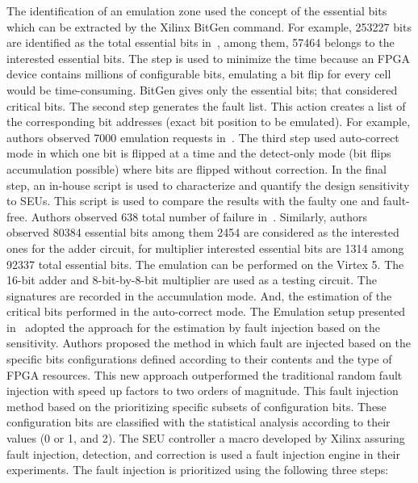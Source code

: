 The identification of an emulation zone used the concept of the essential bits which can be extracted by the Xilinx BitGen command. For example, 253227 bits are identified as the total essential bits in~\cite{hobeika2013flight}, among them, 57464 belongs to the interested essential bits. The step is used to minimize the time because an FPGA device contains millions of configurable bits, emulating a bit flip for every cell would be time-consuming. BitGen gives only the essential bits; that
considered critical bits. The second step generates the fault list. This action creates a list of the corresponding bit addresses (exact bit position to be emulated).  For example, authors observed 7000 emulation requests in~\cite{hobeika2013flight}.  The third step used auto-correct mode in which one bit is flipped at a time and the detect-only mode  (bit flips accumulation possible) where bits are flipped without correction. In the final step, an in-house script is used to characterize and quantify the design sensitivity to SEUs. This script is used to compare the results with the faulty one and fault-free. Authors observed 638 total number of failure in~\cite{hobeika2013flight}. Similarly, authors observed 80384 essential bits among them 2454 are considered as the interested ones for the adder circuit, for multiplier interested essential bits are 1314 among 92337 total essential bits.
The emulation can be performed on the Virtex 5. The 16-bit adder and  8-bit-by-8-bit multiplier are used as a testing circuit. The signatures are recorded in the accumulation mode. And, the estimation of the critical bits performed in the auto-correct mode.
The Emulation setup presented in~\cite{souari2015optimization} adopted the approach for the estimation by fault injection based on the sensitivity. Authors proposed the method in which fault are injected based on the specific bits configurations defined according to their contents and the type of FPGA resources. This new approach outperformed the traditional random fault injection with speed up factors to two orders of magnitude. This fault injection method based on the prioritizing specific subsets of configuration bits. These configuration bits are classified with the statistical analysis according to their values (0 or 1, and 2). The SEU controller a macro developed by Xilinx assuring fault injection, detection, and correction is used a fault injection engine in their experiments. The fault injection is prioritized using the following three steps:

